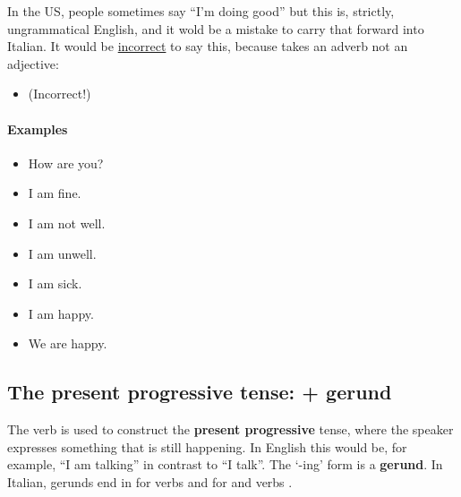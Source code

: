 In the US, people sometimes say ``I'm doing good'' but this is, strictly, ungrammatical 
English, and it wold be a mistake to carry that forward into Italian. 
It would be \uline{incorrect} to say this, because  takes an adverb not an adjective:
\begin{itemize}
    \item (Incorrect!)  
\end{itemize}

\paragraph{Examples}
\begin{itemize}
    \item How are you? \\
    \item I am fine. \\
    \item I am not well. \\
    \item I am unwell. \\
    \item I am sick. \\
    \item I am happy. \\
    \item We are happy. \\
\end{itemize}

\newpage

\subsection{The present progressive tense:  + gerund}
    The verb  is used to construct the \textbf{present progressive} tense, 
	where the speaker expresses something that is still happening. In English this 
	would be, for example, ``I am talking'' in contrast to ``I talk''. The `-ing' 
	form is a \textbf{gerund}. In Italian, gerunds end in  for   
	verbs and   for  and  verbs .

